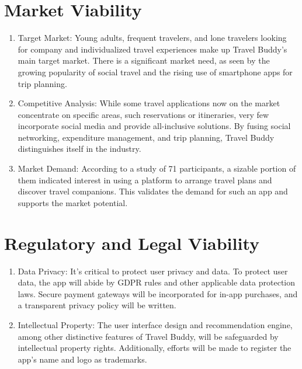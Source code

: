 \documentclass[12pt,a4paper]{report}
\begin{document}
\section{Market Viability}
\begin{enumerate}
  
 \item Target Market: Young adults, frequent travelers, and lone travelers looking for company and individualized travel experiences make up Travel Buddy's main target market. There is a significant market need, as seen by the growing popularity of social travel and the rising use of smartphone apps for trip planning.

 \item Competitive Analysis: While some travel applications now on the market concentrate on specific areas, such reservations or itineraries, very few incorporate social media and provide all-inclusive solutions. By fusing social networking, expenditure management, and trip planning, Travel Buddy distinguishes itself in the industry.

 \item Market Demand: According to a study of 71 participants, a sizable portion of them indicated interest in using a platform to arrange travel plans and discover travel companions. This validates the demand for such an app and supports the market potential.
\end{enumerate}
\section{Regulatory and Legal Viability}
\begin{enumerate}

    \item Data Privacy: It's critical to protect user privacy and data. To protect user data, the app will abide by GDPR rules and other applicable data protection laws. Secure payment gateways will be incorporated for in-app purchases, and a transparent privacy policy will be written.

    \item Intellectual Property: The user interface design and recommendation engine, among other distinctive features of Travel Buddy, will be safeguarded by intellectual property rights. Additionally, efforts will be made to register the app's name and logo as trademarks.

\end{enumerate}
\end{document}
